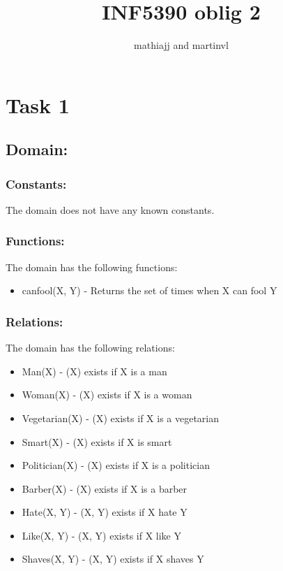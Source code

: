 \documentclass[a4paper, english, 11pt]{article}
\title{INF5390 oblig 2}
\author{mathiajj and martinvl}
\begin{document}
\maketitle

\section*{Task 1}

\subsection*{Domain:}

\subsubsection*{Constants:}

The domain does not have any known constants.

\subsubsection*{Functions:}

The domain has the following functions:

\begin{itemize}

	\item
	canfool(X, Y) - Returns the set of times when X can fool Y

\end{itemize}

\subsubsection*{Relations:}

The domain has the following relations:

\begin{itemize}

	\item
	Man(X) - (X) exists if X is a man
	\item
	Woman(X) - (X) exists if X is a woman
	\item
	Vegetarian(X) - (X) exists if X is a vegetarian
	\item
	Smart(X) - (X) exists if X is smart
	\item
	Politician(X) - (X) exists if X is a politician
	\item
	Barber(X) - (X) exists if X is a barber
	\item
	Hate(X, Y) - (X, Y) exists if X hate Y
	\item
	Like(X, Y) - (X, Y) exists if X like Y
	\item
	Shaves(X, Y) - (X, Y) exists if X shaves Y

\end{itemize}
\end{document}
